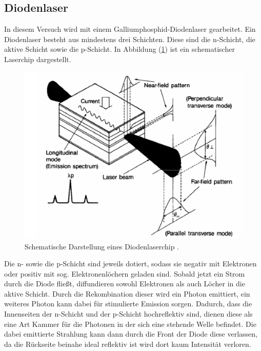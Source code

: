 \subsection{Diodenlaser}
In diesem Versuch wird mit einem Galliumphosphid-Diodenlaser gearbeitet. Ein Diodenlaser besteht aus mindestens drei Schichten. Diese sind die n-Schicht, die aktive Schicht sowie die p-Schicht.
In Abbildung (\ref{fig:diod}) ist ein schematischer Laserchip dargestellt.
\begin{figure}[h!]
  \centering
  \includegraphics[scale=0.7]{fig/diod.png}
  \caption{Schematische Darstellung eines Diodenlaserchip \cite[3]{Anleitung}.}
  \label{fig:diod}
\end{figure}
\FloatBarrier
\noindent Die n- sowie die p-Schicht sind jeweils dotiert, sodass sie negativ mit Elektronen oder positiv mit sog. Elektronenlöchern geladen sind. Sobald jetzt ein Strom durch die Diode fließt, diffundieren sowohl Elektronen als auch Löcher in die aktive Schicht. Durch die Rekombination dieser wird ein Photon emittiert, ein weiteres Photon kann dabei für stimulierte Emission sorgen.
Dadurch, dass die Innenseiten der n-Schicht und der p-Schicht hochreflektiv sind, dienen diese als eine Art Kammer für die Photonen in der sich eine stehende Welle befindet.
Die dabei emittierte Strahlung kann dann durch die Front der Diode diese verlassen, da die Rückseite beinahe ideal reflektiv ist wird dort kaum Intensität verloren.\\

